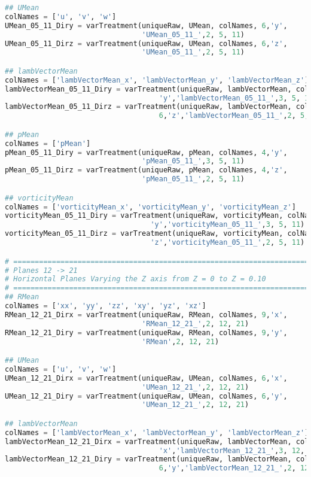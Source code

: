 \begin{lstlisting}[language=python]
## UMean
colNames = ['u', 'v', 'w']
UMean_05_11_Diry = varTreatment(uniqueRaw, UMean, colNames, 6,'y',
                                'UMean_05_11_',2, 5, 11)
UMean_05_11_Dirz = varTreatment(uniqueRaw, UMean, colNames, 6,'z',
                                'UMean_05_11_',2, 5, 11)

## lambVectorMean
colNames = ['lambVectorMean_x', 'lambVectorMean_y', 'lambVectorMean_z']
lambVectorMean_05_11_Diry = varTreatment(uniqueRaw, lambVectorMean, colNames, 6,
                                    'y','lambVectorMean_05_11_',3, 5, 11)
lambVectorMean_05_11_Dirz = varTreatment(uniqueRaw, lambVectorMean, colNames,
                                    6,'z','lambVectorMean_05_11_',2, 5, 11)

## pMean
colNames = ['pMean']
pMean_05_11_Diry = varTreatment(uniqueRaw, pMean, colNames, 4,'y',
                                'pMean_05_11_',3, 5, 11)
pMean_05_11_Dirz = varTreatment(uniqueRaw, pMean, colNames, 4,'z',
                                'pMean_05_11_',2, 5, 11)

## vorticityMean
colNames = ['vorticityMean_x', 'vorticityMean_y', 'vorticityMean_z']
vorticityMean_05_11_Diry = varTreatment(uniqueRaw, vorticityMean, colNames, 6,
                                  'y','vorticityMean_05_11_',3, 5, 11)
vorticityMean_05_11_Dirz = varTreatment(uniqueRaw, vorticityMean, colNames, 6,
                                  'z','vorticityMean_05_11_',2, 5, 11)

# =============================================================================
# Planes 12 -> 21
# Horizontal Planes Varying the Z axis from Z = 0 to Z = 0.10
# =============================================================================
## RMean
colNames = ['xx', 'yy', 'zz', 'xy', 'yz', 'xz']
RMean_12_21_Dirx = varTreatment(uniqueRaw, RMean, colNames, 9,'x',
                                'RMean_12_21_',2, 12, 21)
RMean_12_21_Diry = varTreatment(uniqueRaw, RMean, colNames, 9,'y',
                                'RMean',2, 12, 21)

## UMean
colNames = ['u', 'v', 'w']
UMean_12_21_Dirx = varTreatment(uniqueRaw, UMean, colNames, 6,'x',
                                'UMean_12_21_',2, 12, 21)
UMean_12_21_Diry = varTreatment(uniqueRaw, UMean, colNames, 6,'y',
                                'UMean_12_21_',2, 12, 21)

## lambVectorMean
colNames = ['lambVectorMean_x', 'lambVectorMean_y', 'lambVectorMean_z']
lambVectorMean_12_21_Dirx = varTreatment(uniqueRaw, lambVectorMean, colNames, 6,
                                    'x','lambVectorMean_12_21_',3, 12, 21)
lambVectorMean_12_21_Diry = varTreatment(uniqueRaw, lambVectorMean, colNames,
                                    6,'y','lambVectorMean_12_21_',2, 12, 21)


\end{lstlisting}
